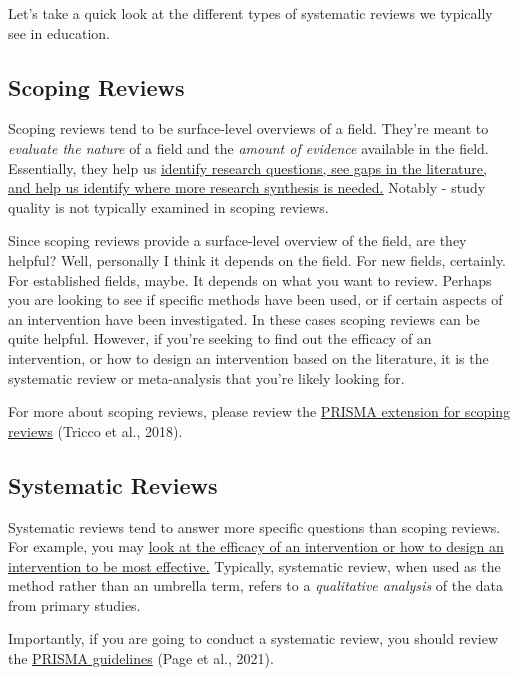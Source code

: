 \documentclass[
]{book}
\begin{document}
Let's take a quick look at the different types of systematic reviews we typically see in education.

\hypertarget{scoping-reviews}{%
\subsection{Scoping Reviews}\label{scoping-reviews}}

Scoping reviews tend to be surface-level overviews of a field. They're meant to \emph{evaluate the nature} of a field and the \emph{amount of evidence} available in the field. Essentially, they help us \ul{identify research questions, see gaps in the literature, and help us identify where more research synthesis is needed.} Notably - study quality is not typically examined in scoping reviews.

Since scoping reviews provide a surface-level overview of the field, are they helpful? Well, personally I think it depends on the field. For new fields, certainly. For established fields, maybe. It depends on what you want to review. Perhaps you are looking to see if specific methods have been used, or if certain aspects of an intervention have been investigated. In these cases scoping reviews can be quite helpful. However, if you're seeking to find out the efficacy of an intervention, or how to design an intervention based on the literature, it is the systematic review or meta-analysis that you're likely looking for.

For more about scoping reviews, please review the \href{http://www.prisma-statement.org/Extensions/ScopingReviews}{PRISMA extension for scoping reviews} (Tricco et al., 2018)\citep{tricco2018}.

\hypertarget{systematic-reviews}{%
\subsection{Systematic Reviews}\label{systematic-reviews}}

Systematic reviews tend to answer more specific questions than scoping reviews. For example, you may \ul{look at the efficacy of an intervention or how to design an intervention to be most effective.} Typically, systematic review, when used as the method rather than an umbrella term, refers to a \emph{qualitative analysis} of the data from primary studies.

Importantly, if you are going to conduct a systematic review, you should review the \href{http://www.prisma-statement.org/}{PRISMA guidelines} (Page et al., 2021)\citep{page2021}.
\end{document}
